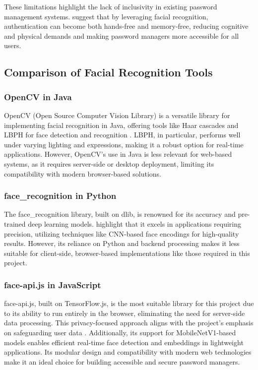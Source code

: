 These limitations highlight the lack of inclusivity in existing password management systems. \textcite{Distante2022} suggest that by leveraging facial recognition, authentication can become both hands-free and memory-free, reducing cognitive and physical demands and making password managers more accessible for all users.
\subsection{Comparison of Facial Recognition Tools}

\subsubsection{OpenCV in Java}  
OpenCV (Open Source Computer Vision Library) is a versatile library for implementing facial recognition in Java, offering tools like Haar cascades and LBPH for face detection and recognition \autocite{Dominguez2017}. LBPH, in particular, performs well under varying lighting and expressions, making it a robust option for real-time applications. However, OpenCV’s use in Java is less relevant for web-based systems, as it requires server-side or desktop deployment, limiting its compatibility with modern browser-based solutions.

\subsubsection{face\_recognition in Python}  
The face\_recognition library, built on dlib, is renowned for its accuracy and pre-trained deep learning models. \textcite{Zhang2020} highlight that it excels in applications requiring precision, utilizing techniques like CNN-based face encodings for high-quality results. However, its reliance on Python and backend processing makes it less suitable for client-side, browser-based implementations like those required in this project.

\subsubsection{face-api.js in JavaScript}  
face-api.js, built on TensorFlow.js, is the most suitable library for this project due to its ability to run entirely in the browser, eliminating the need for server-side data processing. This privacy-focused approach aligns with the project’s emphasis on safeguarding user data \autocite{Vageele2024}. Additionally, its support for MobileNetV1-based models enables efficient real-time face detection and embeddings in lightweight applications. Its modular design and compatibility with modern web technologies make it an ideal choice for building accessible and secure password managers.



